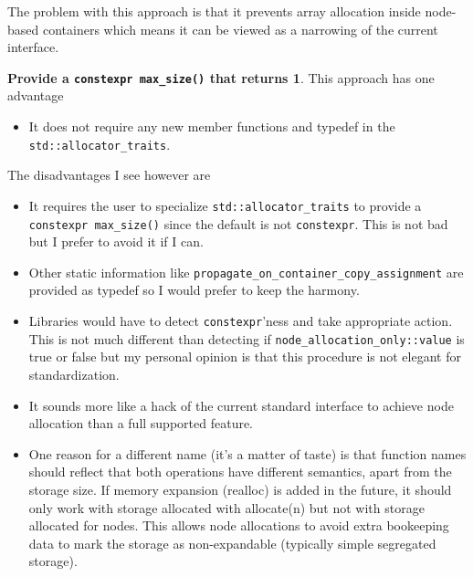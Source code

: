 \documentclass[11pt]{article}
\begin{document}
The problem with this approach is that it prevents array allocation inside
node-based containers which means it can be viewed as a narrowing of the
current interface.

\medskip
\noindent
{\bf Provide a \texttt{constexpr max\_size()} that returns 1}. This approach has one advantage

\begin{itemize}
\item It does not require any new member functions and typedef in the
\texttt{std::allocator\_traits}.
\end{itemize}

The disadvantages I see however are

\begin{itemize}
\item It requires the user to specialize \texttt{std::allocator\_traits} to
provide a \texttt{constexpr max\_size()} since the default is not
\texttt{constexpr}. This is not bad but I prefer to avoid it if I can.

\item Other static information like \texttt{propagate\_on\_container\_copy\_assignment}
are provided as typedef so I would prefer to keep the harmony.

\item Libraries would have to detect \texttt{constexpr}'ness and take appropriate action.
This is not much different than detecting if \texttt{node\_allocation\_only::value} is true or
false but my personal opinion is that this procedure is not elegant for standardization.

\item It sounds more like a hack of the current standard interface to achieve node
allocation than a full supported feature.

\item One reason for a different name (it's a matter of taste) is that function
names should reflect that both operations have different semantics, apart from
the storage size. If memory expansion (realloc) is added in the future, it
should only work with storage allocated with allocate(n) but not with storage
allocated for nodes. This allows node allocations to avoid extra bookeeping
data to mark the storage as non-expandable (typically simple segregated
storage).

\end{itemize}
\end{document}
